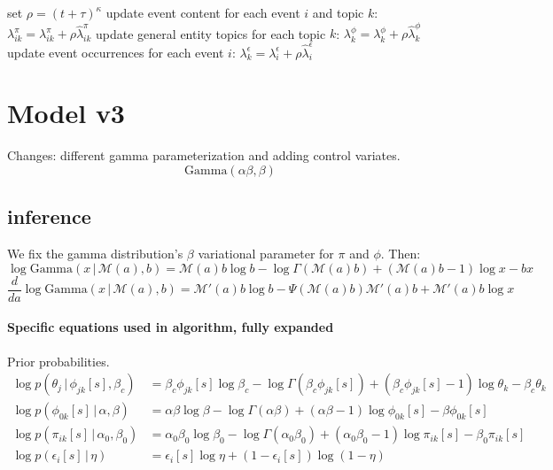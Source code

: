 \documentclass{article}
\newcommand{\g}{\, | \,}
\begin{document}
\begin{algorithm}[h]
\begin{algorithmic}[1]
		\EndFor
	\EndFor
	\State set $\rho= (t +\tau)^\kappa$
	\State update event content for each event $i$ and topic $k$: $\lambda^{\pi}_{ik} = \lambda^{\pi}_{ik} + \rho \hat\lambda^{\pi}_{ik} $
	\State update general entity topics for each topic $k$: $\lambda^{\phi}_{k} = \lambda^{\phi}_{k} + \rho \hat\lambda^{\phi}_{k}$
	\State update event occurrences for each event $i$: $\lambda^{\epsilon}_{k} = \lambda^{\epsilon}_{i} + \rho \hat\lambda^{\epsilon}_{i}$
\end{algorithmic}
\end{algorithm}





\section{Model v3}
Changes: different gamma parameterization and adding control variates.
\[\mbox{Gamma}(\alpha\beta, \beta)\]

\subsection{inference}
We fix the gamma distribution's $\beta$ variational parameter for $\pi$ and $\phi$.  Then:
\[\log\mbox{Gamma}(x \g \mathcal{M}(a), b) = 
\mathcal{M}(a)b\log b - \log\Gamma \left(\mathcal{M}(a)b\right) +(\mathcal{M}(a)b-1)\log x - bx
\]
\[\frac{d}{d a}\log\mbox{Gamma}(x \g \mathcal{M}(a), b) = 
\mathcal{M}'(a) b \log b - \Psi \left(\mathcal{M}(a)b\right)\mathcal{M}'(a)b + \mathcal{M}'(a)b\log x
\]

\paragraph{Specific equations used in algorithm, fully expanded}
Prior probabilities.
\begin{align}
 \log p(\theta_j \g \phi_{jk}[s], \beta_c) &= \beta_c \phi_{jk}[s] \log \beta_c - \log\Gamma(\beta_c \phi_{jk}[s]) + (\beta_c \phi_{jk}[s] - 1) \log \theta_k - \beta_c \theta_k \label{eq:logp.theta.v3}\\
\log p(\phi_{0k}[s] \g \alpha, \beta) &= \alpha\beta \log \beta - \log\Gamma(\alpha\beta) + (\alpha\beta - 1) \log \phi_{0k}[s] - \beta \phi_{0k}[s] \label{eq:logp.phi.v3}\\
\log p(\pi_{ik}[s] \g \alpha_0, \beta_0) &= \alpha_0\beta_0 \log \beta_0 - \log\Gamma(\alpha_0\beta_0) + (\alpha_0\beta_0 - 1) \log \pi_{ik}[s] - \beta_0 \pi_{ik}[s] \label{eq:logp.pi.v3} \\
\log p(\epsilon_{i}[s] \g \eta) &= \epsilon_i[s]\log\eta + (1-\epsilon_i[s])\log(1-\eta) \label{eq:logp.epsilon.v3}
\end{align}
\end{document}
